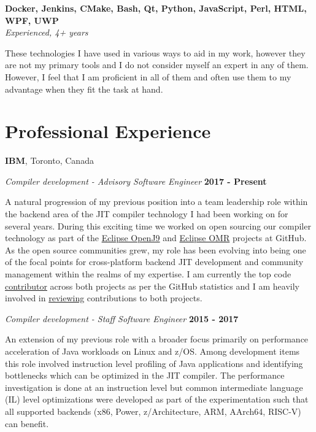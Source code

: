\documentclass[margin,line]{res}
\begin{document}
\begin{resume}
{\bf Docker, Jenkins, CMake, Bash, Qt, Python, JavaScript, Perl, HTML, WPF, UWP } \\
{\em Experienced, 4+ years}

These technologies I have used in various ways to aid in my work, however they are not my primary tools and I do not
consider myself an expert in any of them. However, I feel that I am proficient in all of them and often use them to my
advantage when they fit the task at hand.

\section{\sc Professional Experience}
{\bf IBM}, Toronto, Canada

{\em Compiler development - Advisory Software Engineer} \hfill {\bf 2017 - Present}
\vspace{-.12in}

A natural progression of my previous position into a team leadership role within the backend area of the JIT compiler 
technology I had been working on for several years. During this exciting time we worked on open sourcing our compiler
technology as part of the \href{https://github.com/eclipse/openj9}{Eclipse OpenJ9} and 
\href{https://github.com/eclipse/omr}{Eclipse OMR} projects at GitHub. As the open source communities grew, my role has
been evolving into being one of the focal points for cross-platform backend JIT development and community management
within the realms of my expertise. I am currently the top code \href{https://github.com/eclipse/omr/graphs/contributors}
{contributor} across both projects as per the GitHub statistics and I am heavily involved in 
\href{https://github.com/eclipse/omr/pulls?q=is%3Apr+sort%3Aupdated-desc+reviewed-by%3Afjeremic+is%3Aclosed+}{reviewing} 
contributions to both projects.

{\em Compiler development - Staff Software Engineer} \hfill {\bf 2015 - 2017}
\vspace{-.12in}

An extension of my previous role with a broader focus primarily on performance acceleration of Java workloads on Linux
and z/OS. Among development items this role involved instruction level profiling of Java applications and identifying
bottlenecks which can be optimized in the JIT compiler. The performance investigation is done at an instruction level
but common intermediate language (IL) level optimizations were developed as part of the experimentation such that all
supported backends (x86, Power, z/Architecture, ARM, AArch64, RISC-V) can benefit.


\end{resume}
\end{document}
